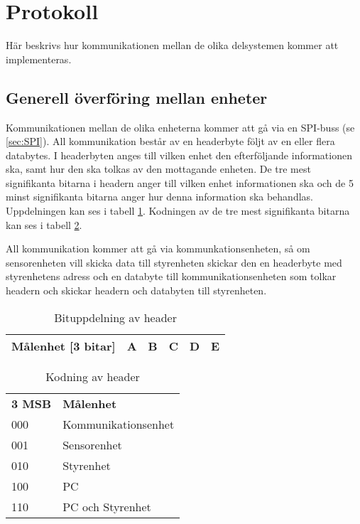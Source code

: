 \section{Protokoll}
\label{sec:Protokoll}
Här beskrivs hur kommunikationen mellan de olika delsystemen kommer att implementeras.

\subsection{Generell överföring mellan enheter}
Kommunikationen mellan de olika enheterna kommer att gå via en SPI-buss (se \ref{sec:SPI}).
All kommunikation består av en headerbyte följt av en eller flera databytes.
I headerbyten anges till vilken enhet den efterföljande informationen ska, samt hur den ska tolkas av den mottagande enheten.
De tre mest signifikanta bitarna i headern anger till vilken enhet informationen ska och de 5 minst signifikanta bitarna anger 
hur denna information ska behandlas. Uppdelningen kan ses i tabell \ref{tab:header}.
Kodningen av de tre mest signifikanta bitarna kan ses i tabell \ref{tab:headerkod}.

All kommunikation kommer att gå via kommunkationsenheten, så om sensorenheten vill 
skicka data till styrenheten skickar den en headerbyte med styrenhetens adress och en databyte till kommunikationsenheten som 
tolkar headern och skickar headern och databyten till styrenheten.
\begin{table}[h]
  \centering
  \begin{tabular}{| c | c | c | c | c | c |}
    \hline
    Målenhet [3 bitar] & A & B & C & D & E \\
    \hline
  \end{tabular}
  \caption{Bituppdelning av header}
  \label{tab:header}
\end{table}

\begin{table}[h]
  \centering
  \begin{tabular}{l l}
    \textbf{3 MSB} & \textbf{Målenhet} \\
    000 & Kommunikationsenhet \\
    001 & Sensorenhet \\
    010 & Styrenhet \\
    100 & PC \\
    110 & PC och Styrenhet\\
  \end{tabular}
  \caption{Kodning av header}
  \label{tab:headerkod}
\end{table}


